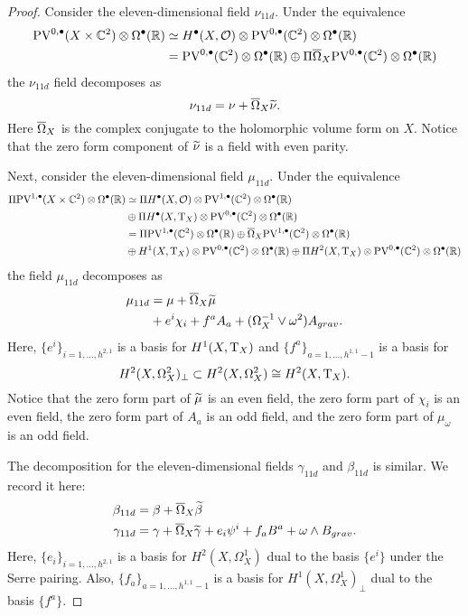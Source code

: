 \begin{proof}
Consider the eleven-dimensional field $\nu_{11d}$. 
Under the equivalence
\begin{align*}
\PV^{0,\bu}(X \times \CC^2) \otimes \Omega^\bu(\RR) & \simeq H^{\bu}(X, \cO) \otimes \PV^{0,\bu}(\CC^2) \otimes \Omega^\bu(\RR) \\ & = \PV^{0,\bu}(\CC^2) \otimes \Omega^\bu(\RR) \oplus \Pi \Bar{\Omega}_X \PV^{0,\bu}(\CC^2) \otimes \Omega^\bu(\RR) 
\end{align*}
the $\nu_{11d}$ field decomposes as 
\[ 
\nu_{11d} = \nu + \Bar{\Omega}_X \til \nu .
\]
Here $\Bar{\Omega}_X$ is the complex conjugate to the holomorphic volume form on $X$. 
Notice that the zero form component of $\til \nu$ is a field with even parity. 

Next, consider the eleven-dimensional field $\mu_{11d}$. 
Under the equivalence 
\begin{align*}
\Pi \PV^{1,\bu}(X \times \CC^2) \otimes \Omega^\bu(\RR) & \simeq \Pi H^{\bu}(X, \cO) \otimes \PV^{1,\bu}(\CC^2) \otimes \Omega^\bu(\RR) \\ & \oplus \Pi H^\bu(X, \T_X) \otimes \PV^{0,\bu}(\CC^2) \otimes \Omega^\bu(\RR) \\ & = \Pi \PV^{1,\bu}(\CC^2) \otimes \Omega^\bu(\RR) \oplus \Bar{\Omega}_X \PV^{1,\bu}(\CC^2) \otimes \Omega^\bu(\RR) \\ & \oplus H^{1}(X, \T_X) \otimes \PV^{0,\bu}(\CC^2) \otimes \Omega^\bu(\RR) \oplus \Pi H^{2}(X, \T_X) \otimes \PV^{0,\bu}(\CC^2) \otimes \Omega^\bu(\RR)
\end{align*}
the field $\mu_{11d}$ decomposes as 
\begin{align*}
\mu_{11d} & = \mu + \Bar{\Omega}_X \til \mu \\ 
& + e^i \chi_i + f^a A_a +  (\Omega_X^{-1} \vee \omega^2)A_{grav} .  
\end{align*} 
Here, $\{e^i\}_{i=1,\ldots, h^{2,1}}$ is a basis for $H^{1}(X, \T_X)$ and $\{f^a\}_{a=1,\ldots, h^{1,1}-1}$ is a basis for 
\[
H^2 (X, \Omega^2_X)_\perp \subset H^2(X, \Omega^2_X) \cong H^2(X, \T_X) . 
\]
Notice that the zero form part of $\til{\mu}$ is an even field, the zero form part of $\chi_i$ is an even field, the zero form part of $A_a$ is an odd field, and the zero form part of $\mu_\omega$ is an odd field. 

The decomposition for the eleven-dimensional fields $\gamma_{11d}$ and $\beta_{11d}$ is similar. 
We record it here:
\begin{align*}
\beta_{11d} & = \beta + \Bar{\Omega}_X \til \beta \\ 
\gamma_{11d} & = \gamma + \Bar{\Omega}_X \til \gamma + e_i \psi^i + f_a B^a + \omega \wedge B_{grav}  . 
\end{align*}
Here, $\{e_i\}_{i=1,\ldots,h^{2,1}}$ is a basis for $H^2 (X, \Omega^1_X)$ dual to the basis $\{e^i\}$ under the Serre pairing.
Also, $\{f_a\}_{a=1,\ldots,h^{1,1}-1}$ is a basis for $H^{1}(X, \Omega^1_X)_\perp$ dual to the basis $\{f^a\}$. 


\end{proof}
